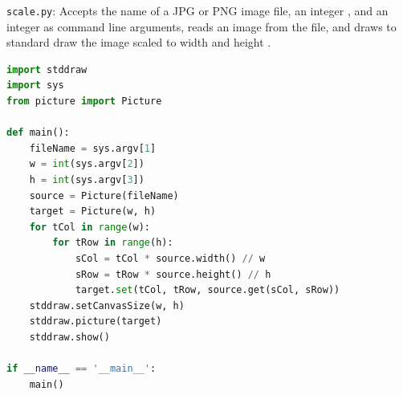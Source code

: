 \documentclass[8pt,a4paper,compress,handout]{beamer}
\begin{document}
\begin{frame}[fragile]
\begin{framed}
\tiny \lstinline{scale.py}: Accepts the name  of a JPG or PNG image file, an integer , and an integer  as command line arguments, reads an image from the file, and draws to standard draw the image scaled to width  and height .
\end{framed}

\begin{lstlisting}[language=Python]
import stddraw
import sys
from picture import Picture

def main():
    fileName = sys.argv[1]
    w = int(sys.argv[2])
    h = int(sys.argv[3])
    source = Picture(fileName)
    target = Picture(w, h)
    for tCol in range(w):
        for tRow in range(h):
            sCol = tCol * source.width() // w
            sRow = tRow * source.height() // h
            target.set(tCol, tRow, source.get(sCol, sRow))
    stddraw.setCanvasSize(w, h)
    stddraw.picture(target)
    stddraw.show()

if __name__ == '__main__':
    main()
\end{lstlisting}
\end{frame}
\end{document}
